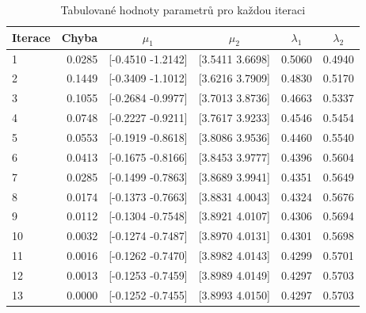 \begin{table}[htb]
    \centering

    \begin{tabular}{lrcccc}
        \toprule

        Iterace & Chyba     & \( \mu_1 \)       & \( \mu_2 \)       & \( \lambda_1 \)   & \( \lambda_2 \)   \\ \midrule
        1       & 0.0285    & [-0.4510 -1.2142] & [3.5411 3.6698]   & 0.5060            & 0.4940            \\
        2       & 0.1449    & [-0.3409 -1.1012] & [3.6216 3.7909]   & 0.4830            & 0.5170            \\
        3       & 0.1055    & [-0.2684 -0.9977] & [3.7013 3.8736]   & 0.4663            & 0.5337            \\
        4       & 0.0748    & [-0.2227 -0.9211] & [3.7617 3.9233]   & 0.4546            & 0.5454            \\
        5       & 0.0553    & [-0.1919 -0.8618] & [3.8086 3.9536]   & 0.4460            & 0.5540            \\
        6       & 0.0413    & [-0.1675 -0.8166] & [3.8453 3.9777]   & 0.4396            & 0.5604            \\
        7       & 0.0285    & [-0.1499 -0.7863] & [3.8689 3.9941]   & 0.4351            & 0.5649            \\
        8       & 0.0174    & [-0.1373 -0.7663] & [3.8831 4.0043]   & 0.4324            & 0.5676            \\
        9       & 0.0112    & [-0.1304 -0.7548] & [3.8921 4.0107]   & 0.4306            & 0.5694            \\
        10      & 0.0032    & [-0.1274 -0.7487] & [3.8970 4.0131]   & 0.4301            & 0.5698            \\
        11      & 0.0016    & [-0.1262 -0.7470] & [3.8982 4.0143]   & 0.4299            & 0.5701            \\
        12      & 0.0013    & [-0.1253 -0.7459] & [3.8989 4.0149]   & 0.4297            & 0.5703            \\
        13      & 0.0000    & [-0.1252 -0.7455] & [3.8993 4.0150]   & 0.4297            & 0.5703            \\
          
        \bottomrule
    \end{tabular}

    \caption{Tabulované hodnoty parametrů pro každou iteraci}
    \label{table:table1}
\end{table}
\FloatBarrier

